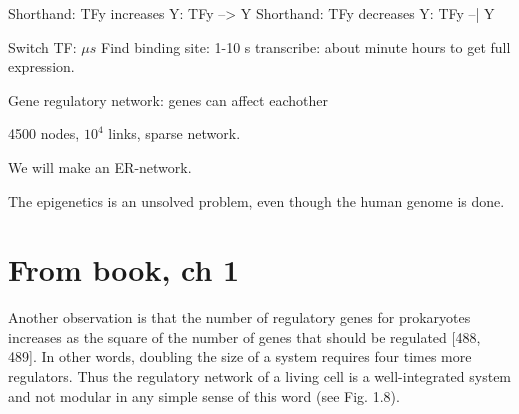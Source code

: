 \documentclass{article}
\begin{document}
Shorthand: TFy increases Y: TFy --> Y 
Shorthand: TFy decreases Y: TFy --| Y 

Switch TF: $\mu s$
Find binding site: 1-10 s 
transcribe: about minute
hours to get full expression. 

Gene regulatory network: genes can affect eachother

4500 nodes, $10^{4}$ links, sparse network. 

We will make an ER-network.		

The epigenetics is an unsolved problem, even though the human genome is done. 


\section{From book, ch 1}
Another observation is that the number of regulatory genes for prokaryotes
increases as the square of the number of genes that should be regulated [488, 489]. In
other words, doubling the size of a system requires four times more regulators. Thus the
regulatory network of a living cell is a well-integrated system and not modular in any
simple sense of this word (see Fig. 1.8).
\end{document}
